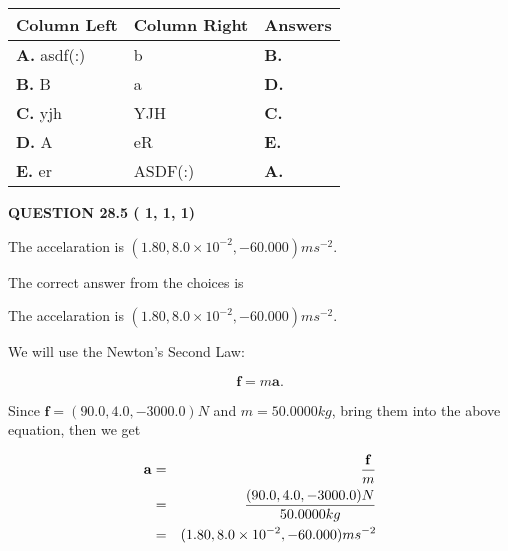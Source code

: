 \documentclass[12pt]{article}
\begin{document}
  
\begin{tabular}{|l|l|l|}
 \hline
 Column Left & Column Right  & Answers       \\ 
 \hline
{\textbf{\large{
A.}}}
asdf(:)
  & 
b
 & 
{\textbf{\large{
B.}}}
 \\ 
 \hline
{\textbf{\large{
B.}}}
B
  & 
a
 & 
{\textbf{\large{
D.}}}
 \\ 
 \hline
{\textbf{\large{
C.}}}
yjh
  & 
YJH
 & 
{\textbf{\large{
C.}}}
 \\ 
 \hline
{\textbf{\large{
D.}}}
A
  & 
eR
 & 
{\textbf{\large{
E.}}}
 \\ 
 \hline
{\textbf{\large{
E.}}}
er
  & 
ASDF(:)
 & 
{\textbf{\large{
A.}}}
 \\ 
 \hline
 \end{tabular}
  
  
 
 
 
 
  
\vspace{0.2in}
  
{\textbf{\Large{QUESTION
28.5 
 (          1,          1,          1)
}}}
  
  


 
 
\noindent{}
 
 
The accelaration is $  %
(
1.80,
8.0 \times 10^{-2},
-60.000)
ms^{-2} $.
 
 
 
 
 
 
\noindent{}

The correct answer from the choices is


The accelaration is $  %
(
1.80,
8.0 \times 10^{-2},
-60.000)
ms^{-2} $.
 
 
 
 
 
\noindent{}

We will use the Newton's Second Law:
 
\[
\mathbf{f}=m\mathbf{a}.
\]
 
Since $\mathbf{f}= %
(90.0 , 4.0 , -3000.0) N$
and $m= %
50.0000kg$, bring them into the above equation, then we get
 
\begin{eqnarray*}
\mathbf{a}&=&\frac{\mathbf{f}}m  \\
&=&\frac{ %
(90.0 , 4.0 , -3000.0) N}{ %
50.0000kg}  \\
&=& %
(1.80 , 8.0 \times 10^{-2} , -60.000) ms^{-2}
\end{eqnarray*}
 
\end{document}
